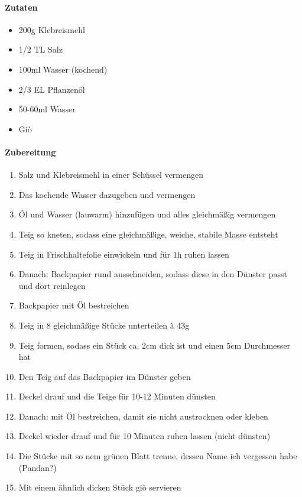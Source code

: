 \newpage
{}
\paragraph{Zutaten}
\begin{itemize}[noitemsep]
	\item 200g Klebreismehl
	\item 1/2 TL Salz
	\item 100ml Wasser (kochend)
	\item 2/3 EL Pflanzenöl
	\item 50-60ml Wasser
	\item Giò 
\end{itemize}

\paragraph{Zubereitung}
\begin{enumerate}[noitemsep]
	\item Salz und Klebreismehl in einer Schüssel vermengen
	\item Das kochende Wasser dazugeben und vermengen
	\item Öl und Wasser (lauwarm) hinzufügen und alles gleichmäßig vermengen
	\item Teig so kneten, sodass eine gleichmäßige, weiche, stabile Masse entsteht
	\item Teig in Frischhaltefolie einwickeln und für 1h ruhen lassen
	\item Danach: Backpapier rund ausschneiden, sodass diese in den Dünster passt und dort reinlegen
	\item Backpapier mit Öl bestreichen
	\item Teig in 8 gleichmäßige Stücke unterteilen à 43g
	\item Teig formen, sodass ein Stück ca. 2cm dick ist und einen 5cm Durchmesser hat
	\item Den Teig auf das Backpapier im Dünster geben
	\item Deckel drauf und die Teige für 10-12 Minuten dünsten
	\item Danach: mit Öl bestreichen, damit sie nicht austrocknen oder kleben
	\item Deckel wieder drauf und für 10 Minuten ruhen lassen (nicht dünsten)
	\item Die Stücke mit so nem grünen Blatt trenne, dessen Name ich vergessen habe (Pandan?)
	\item Mit einem ähnlich dicken Stück giò servieren
\end{enumerate}